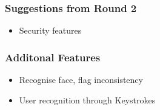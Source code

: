 \documentclass[17pt]{beamer}
\begin{document}
\begin{frame}
\frametitle{Suggestions from Round 2} \pause
\begin{itemize}[<+-|alert@+>]
\item Security features
\end{itemize}
\end{frame}

\begin{frame}
\frametitle{Additonal Features} \pause
\begin{itemize}[<+-|alert@+>]
\item Recognise face, flag inconsistency
\item User recognition through Keystrokes
\end{itemize}
\end{frame}
\end{document}
